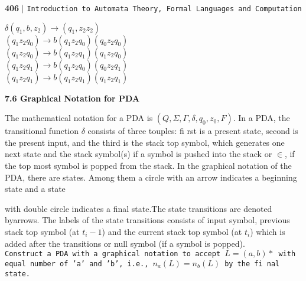 \documentclass{article}
\begin{document}
\newpage
\begin{flushleft}
    \textbf{406}\hspace*{0.1cm} \textbf{$|$} \hspace*{0.1cm} \texttt{Introduction to Automata Theory, Formal Languages and Computation}
  \end{flushleft}

\vspace*{0.5cm}
\begin{center}
$\delta(q_1, b, z_2) \rightarrow (q_1, z_2z_2)$ \\
 \hspace*{2cm} $(q_1 z_2 q_0) \rightarrow b(q_1 z_2 q_0) (q_0 z_2 q_0)$ \\
 \hspace*{2cm} $(q_1  z_2 q_0) \rightarrow b(q_1 z_2 q_1) (q_1 z_2 q_0)$ \\
 \hspace*{2cm} $(q_1 z_2 q_1) \rightarrow b(q_1 z_2 q_0) (q_0 z_2 q_1)$ \\
 \hspace*{2cm} $(q_1 z_2 q_1) \rightarrow b(q_1 z_2 q_1) (q_1 z_2 q_1)$ \\
\end{center}

\vspace*{0.3cm}

\large{
\textbf{7.6 Graphical Notation for PDA}\\
}

\small{The mathematical notation for a PDA is $(Q, \Sigma, \Gamma, \delta, q_0, z_0, F)$. In a PDA, the transitional function $\delta$
consists of three touples: fi rst is a present state, second is the present input, and the third is the stack top
symbol, which generates one next state and the stack symbol(s) if a symbol is pushed into the stack or
$\in$, if the top most symbol is popped from the stack.
In the graphical notation of the PDA, there are states. Among them a circle with an arrow indicates a
beginning state and a state}


 with double circle indicates a final state.The state transitions are denoted byarrows. The labels of the state transitions consists of input symbol, previous stack top symbol (at $t_i-1$) and the current stack top symbol (at $t_i$) which is added after the transitions or null symbol (if a symbol is popped).\\

\hspace*{0.1cm} \texttt{\small{Construct a PDA with a graphical notation to accept $L = (a, b)*$ with equal number of 'a' and 'b', i.e., $n_a(L) = n_b(L)$ by the fi nal state.}}\\
\end{document}
